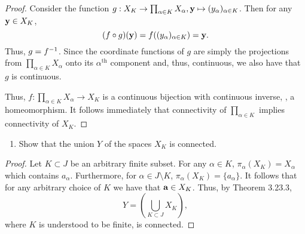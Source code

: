 \begin{solution}
\begin{proof}
    Consider the function $g: X_K \rightarrow \prod_{\alpha\in K} X_\alpha, \mathbf{y} \mapsto (y_\alpha)_{\alpha\in K}$.
    Then for any $\mathbf{y} \in X_K$,
    \begin{equation*}
      (f \circ g)(\mathbf{y}) = f((y_\alpha)_{\alpha\in K}) = \mathbf{y}.
    \end{equation*}
    Thus, $g = f^{-1}$.
    Since the coordinate functions of $g$ are simply the projections from $\prod_{\alpha\in K} X_\alpha$ onto its $\alpha^{\text{th}}$ component and, thus, continuous, we also have that $g$ is continuous.

    Thus, $f: \prod_{\alpha \in K} X_\alpha \rightarrow X_K$ is a continuous bijection with continuous inverse, \ie, a homeomorphism.
    It follows immediately that connectivity of $\prod_{\alpha \in K}$ implies connectivity of $X_K$.
  \end{proof}
  \bigskip

  \begin{enumerate}[label={(\alph*)}, align=left, leftmargin=\parindent, listparindent=\parindent, labelwidth=0pt, itemindent=!]
    \addtocounter{enumi}{1} 
    \item
      Show that the union $Y$ of the spaces $X_K$ is connected.
  \end{enumerate}
  \begin{proof}
    Let $K \subset J$ be an arbitrary finite subset.
    For any $\alpha \in K$, $\pi_\alpha(X_K) = X_\alpha$ which contains $a_\alpha$.
    Furthermore, for $\alpha \in J \setminus K$, $\pi_\alpha(X_K) = \{a_\alpha\}$.
    It follows that for any arbitrary choice of $K$ we have that $\mathbf{a} \in X_K$.
    Thus, by Theorem 3.23.3,
    \begin{equation*}
    Y = \left(\bigcup_{K \subset J} X_K\right),
    \end{equation*}
    where $K$ is understood to be finite, is connected.
  \end{proof}
  \bigskip


\end{solution}
